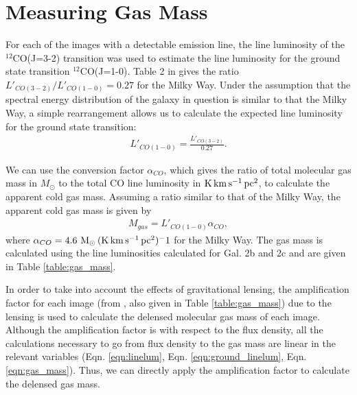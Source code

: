 \documentclass[11pt]{article}
\begin{document}
\section*{Measuring Gas Mass}

For each of the images with a detectable emission line, the line luminosity of the $^{12}$CO(J=3-2) transition was used to estimate the line luminosity for the ground state transition $^{12}$CO(J=1-0). Table 2 in \cite{Carilli2013} gives the ratio $L'_{CO(3-2)} / L'_{CO(1-0)} = 0.27$ for the Milky Way. Under the assumption that the spectral energy distribution of the galaxy in question is similar to that the Milky Way, a simple rearrangement allows us to calculate the expected line luminosity for the ground state transition:
\begin{align}\label{eqn:ground_linelum}
	L'_{CO(1-0)} = \frac{L'_{CO(3-2)}}{0.27}.
\end{align}

We can use the conversion factor $\alpha_{CO}$, which gives the ratio of total molecular gas mass in $M_\odot$ to the total CO line luminosity in ${\rm K\,km\,s^{-1}\,pc^2}$, to calculate the apparent cold gas mass. Assuming a ratio similar to that of the Milky Way, the apparent cold gas mass is given by 
\begin{align}\label{eqn:gas_mass}
	M_{gas} = L'_{CO(1-0)} \alpha_{CO},
\end{align}
where $\alpha_{CO} = 4.6~{\rm M_\odot\,(K\,km\,s^{-1}\,pc^2)^-1}$ for the Milky Way. The gas mass is calculated using the line luminosities calculated for Gal. 2b and 2c and are given in Table \ref{table:gas_mass}.

In order to take into account the effects of gravitational lensing, the amplification factor for each image (from \cite{MacKenzie2014}, also given in Table \ref{table:gas_mass}) due to the lensing is used to calculate the delensed molecular gas mass of each image. Although the amplification factor is with respect to the flux density, all the calculations necessary to go from flux density to the gas mass are linear in the relevant variables (Eqn. \ref{eqn:linelum}, Eqn. \ref{eqn:ground_linelum}, Eqn. \ref{eqn:gas_mass}). Thus, we can directly apply the amplification factor to calculate the delensed gas mass. 
\end{document}

